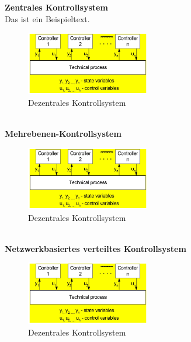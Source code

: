 \documentclass[12pt,a4paper,ngerman]{article}
\begin{document}
\textbf{Zentrales Kontrollsystem}
\\
Das ist ein Beispieltext. 
\begin{figure}[h!]
\vspace{-20pt}
  \begin{center}
    \includegraphics[width=0.48\textwidth]{figures/dezentral.pdf}
  \end{center}
  \caption{Dezentrales Kontrollsystem}
\vspace{-10pt}
\end{figure}
\pagebreak \\
\textbf{Mehrebenen-Kontrollsystem}
\\
\begin{figure}[h!]
\vspace{-20pt}
  \begin{center}
    \includegraphics[width=0.48\textwidth]{figures/dezentral.pdf}
  \end{center}
  \caption{Dezentrales Kontrollsystem}
\vspace{-10pt}
\end{figure}
\\
\textbf{Netzwerkbasiertes verteiltes Kontrollsystem}
\\
\begin{figure}[h!]
\vspace{-20pt}
  \begin{center}
    \includegraphics[width=0.48\textwidth]{figures/dezentral.pdf}
  \end{center}
  \caption{Dezentrales Kontrollsystem}
\vspace{-10pt}
\end{figure}
\end{document}
